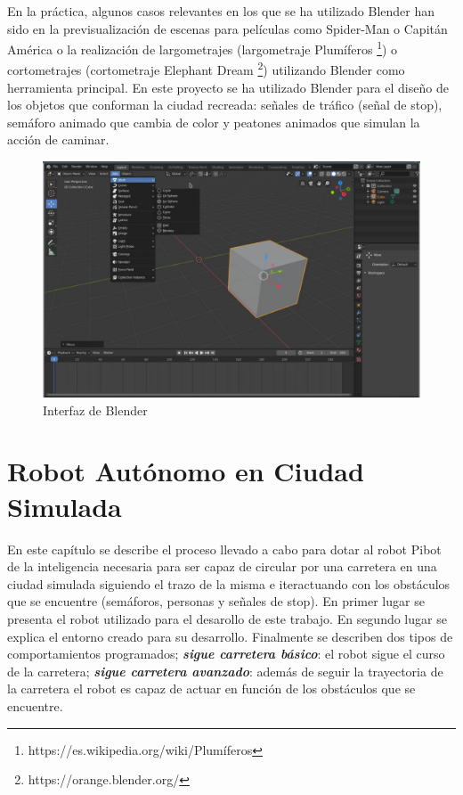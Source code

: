 \documentclass{report}
\begin{document}
En la práctica, algunos casos relevantes en los que se ha utilizado Blender han sido en la previsualización de escenas para películas como Spider-Man o Capitán América o la realización de largometrajes (largometraje Plumíferos \footnote{https://es.wikipedia.org/wiki/Plumíferos}) o cortometrajes (cortometraje Elephant Dream \footnote{https://orange.blender.org/}) utilizando Blender como herramienta principal. En este proyecto se ha utilizado Blender para el diseño de los objetos que conforman la ciudad recreada: señales de tráfico (señal de stop), semáforo animado que cambia de color y peatones animados que simulan la acción de caminar.

\renewcommand{\figurename}{Figura}		
\begin{figure}[h]
	\centering
	 \includegraphics[scale=1.5]{images/blender.jpg}
	 \caption{Interfaz de Blender}
\end{figure}

\chapter{Robot Autónomo en Ciudad Simulada}

En este capítulo se describe el proceso llevado a cabo para dotar al robot Pibot de la inteligencia necesaria para ser capaz de circular por una carretera en una ciudad simulada siguiendo el trazo de la misma e iteractuando con los obstáculos que se encuentre (semáforos, personas y señales de stop). En primer lugar se presenta el robot utilizado para el desarollo de este trabajo. En segundo lugar se explica el entorno creado para su desarrollo. Finalmente se describen dos tipos de comportamientos programados; \textit{\textbf{sigue carretera básico}}: el robot sigue el curso de la carretera; \textit{\textbf{sigue carretera avanzado}}: además de seguir la trayectoria de la carretera el robot es capaz de actuar en función de los obstáculos que se encuentre. 
\end{document}
